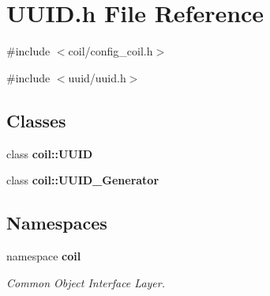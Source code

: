 \section{UUID.h File Reference}
\label{UUID_8h}
{\ttfamily \#include $<$coil/config\_\-coil.h$>$}\par
{\ttfamily \#include $<$uuid/uuid.h$>$}\par
\subsection*{Classes}
\begin{DoxyCompactItemize}
\item 
class {\bf coil::UUID}
\item 
class {\bf coil::UUID\_\-Generator}
\end{DoxyCompactItemize}
\subsection*{Namespaces}
\begin{DoxyCompactItemize}
\item 
namespace {\bf coil}


\begin{DoxyCompactList}\small\item\em Common Object Interface Layer. \item\end{DoxyCompactList}

\end{DoxyCompactItemize}
